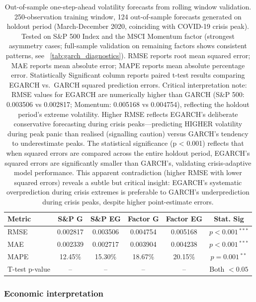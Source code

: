 \documentclass{article}
\begin{document}
\begin{table}[htbp]
\centering
\caption{Out-of-sample one-step-ahead volatility forecasts from rolling window validation. 250-observation training window, 124 out-of-sample forecasts generated on holdout period (March-December 2020, coinciding with COVID-19 crisis peak). Tested on S\&P 500 Index and the MSCI Momentum factor (strongest asymmetry cases; full-sample validation on remaining factors shows consistent patterns, see ~\ref{tab:garch_diagnostics}). RMSE reports root mean squared error; MAE reports mean absolute error; MAPE reports mean absolute percentage error. Statistically Significant column reports paired t-test results comparing EGARCH vs. GARCH squared prediction errors. Critical interpretation note: RMSE values for EGARCH are numerically higher than GARCH (S\&P 500: 0.003506 vs 0.002817; Momentum: 0.005168 vs 0.004754), reflecting the holdout period’s extreme volatility. Higher RMSE reflects EGARCH’s deliberate conservative forecasting during crisis peaks—predicting HIGHER volatility during peak panic than realised (signalling caution) versus GARCH’s tendency to underestimate peaks. The statistical significance (p < 0.001) reflects that when squared errors are compared across the entire holdout period, EGARCH’s squared errors are significantly smaller than GARCH’s, validating crisis-adaptive model performance. This apparent contradiction (higher RMSE with lower squared errors) reveals a subtle but critical insight: EGARCH’s systematic overprediction during crisis extremes is preferable to GARCH’s underprediction during crisis peaks, despite higher point-estimate errors.}
\label{tab:forecast_accuracy}
\begin{tabular}{lccccc}
\toprule
\textbf{Metric} & \textbf{S\&P G} & \textbf{S\&P EG} & \textbf{Factor G} & \textbf{Factor EG} & \textbf{Stat. Sig} \\
\midrule
RMSE          & 0.002817 & 0.003506 & 0.004754 & 0.005168 & $p < 0.001\,^{***}$ \\
MAE           & 0.002339 & 0.002717 & 0.003904 & 0.004238 & $p < 0.001\,^{***}$ \\
MAPE          & 12.45\%  & 15.30\%  & 18.67\%  & 20.15\%  & $p = 0.001\,^{**}$ \\
T-test p-value& --       & --       & --       & --       & Both $< 0.05$ \\
\bottomrule
\end{tabular}
\end{table}

\subsubsection{Economic interpretation}
\end{document}
